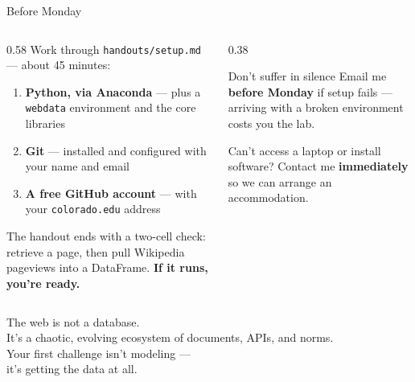 \documentclass[9pt,aspectratio=169]{beamer}
\begin{document}
\begin{frame}{Before Monday}
    \begin{columns}[T]
        \begin{column}{0.58\textwidth}
            Work through \texttt{handouts/setup.md} --- about 45 minutes:
            \begin{enumerate}
                \item \textcolor{tab-blue}{\textbf{Python, via Anaconda}} --- plus a \texttt{webdata} environment and the core libraries
                \item \textcolor{tab-green}{\textbf{Git}} --- installed and configured with your name and email
                \item \textcolor{tab-orange}{\textbf{A free GitHub account}} --- with your \texttt{colorado.edu} address
            \end{enumerate}
            \vspace{0.5em}
            The handout ends with a two-cell check: retrieve a page, then pull Wikipedia pageviews into a DataFrame. \textbf{If it runs, you're ready.}
        \end{column}
        \begin{column}{0.38\textwidth}
            \begin{alertblock}{Don't suffer in silence}
                \footnotesize Email me \textbf{before Monday} if setup fails --- arriving with a broken environment costs you the lab.
                \vspace{0.3em}

                Can't access a laptop or install software? Contact me \textbf{immediately} so we can arrange an accommodation.
            \end{alertblock}
        \end{column}
    \end{columns}
\end{frame}

\begin{frame}[standout]
    The web is not a database.\\
    It's a chaotic, evolving ecosystem of documents, APIs, and norms.\\[1em]
    {\large Your first challenge isn't modeling ---\\ it's getting the data at all.}
\end{frame}
\end{document}
